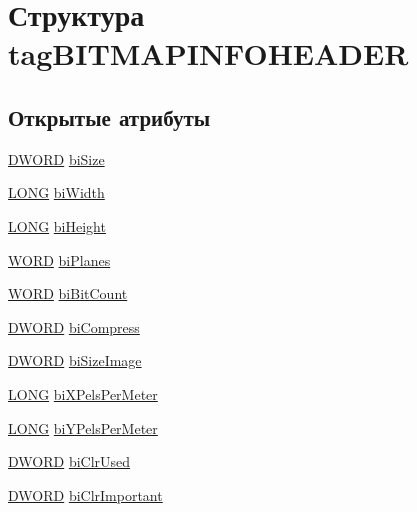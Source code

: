 \hypertarget{structtag_b_i_t_m_a_p_i_n_f_o_h_e_a_d_e_r}{\section{Структура tag\+B\+I\+T\+M\+A\+P\+I\+N\+F\+O\+H\+E\+A\+D\+E\+R}
\label{structtag_b_i_t_m_a_p_i_n_f_o_h_e_a_d_e_r}
}
\subsection*{Открытые атрибуты}
\begin{DoxyCompactItemize}
\item 
\hyperlink{2dgraph_8cpp_a28d75932431ade21e7752c9da7e8b55c}{D\+W\+O\+R\+D} \hyperlink{structtag_b_i_t_m_a_p_i_n_f_o_h_e_a_d_e_r_a78b47f256953606cbf23cd665452a263}{bi\+Size}
\item 
\hyperlink{2dgraph_8cpp_a9154c0d0c21af4686624543215b4e5f2}{L\+O\+N\+G} \hyperlink{structtag_b_i_t_m_a_p_i_n_f_o_h_e_a_d_e_r_a4bbc605184be98c4da36f707f7695e0f}{bi\+Width}
\item 
\hyperlink{2dgraph_8cpp_a9154c0d0c21af4686624543215b4e5f2}{L\+O\+N\+G} \hyperlink{structtag_b_i_t_m_a_p_i_n_f_o_h_e_a_d_e_r_aa18cf290b7f7a6d1cc8058feae85ab68}{bi\+Height}
\item 
\hyperlink{2dgraph_8cpp_a197942eefa7db30960ae396d68339b97}{W\+O\+R\+D} \hyperlink{structtag_b_i_t_m_a_p_i_n_f_o_h_e_a_d_e_r_a261e0f0a578bcd4d53a4a221e6ebe2fa}{bi\+Planes}
\item 
\hyperlink{2dgraph_8cpp_a197942eefa7db30960ae396d68339b97}{W\+O\+R\+D} \hyperlink{structtag_b_i_t_m_a_p_i_n_f_o_h_e_a_d_e_r_a713c58f9cf7d5f115938d189d59fadf5}{bi\+Bit\+Count}
\item 
\hyperlink{2dgraph_8cpp_a28d75932431ade21e7752c9da7e8b55c}{D\+W\+O\+R\+D} \hyperlink{structtag_b_i_t_m_a_p_i_n_f_o_h_e_a_d_e_r_a0dcb903aedbf5e16d964e5a96e44903b}{bi\+Compress}
\item 
\hyperlink{2dgraph_8cpp_a28d75932431ade21e7752c9da7e8b55c}{D\+W\+O\+R\+D} \hyperlink{structtag_b_i_t_m_a_p_i_n_f_o_h_e_a_d_e_r_ac69dfda61a32d8ec53dd11ef165d198b}{bi\+Size\+Image}
\item 
\hyperlink{2dgraph_8cpp_a9154c0d0c21af4686624543215b4e5f2}{L\+O\+N\+G} \hyperlink{structtag_b_i_t_m_a_p_i_n_f_o_h_e_a_d_e_r_ae363738b6e92248a7be41f4e7ed55c54}{bi\+X\+Pels\+Per\+Meter}
\item 
\hyperlink{2dgraph_8cpp_a9154c0d0c21af4686624543215b4e5f2}{L\+O\+N\+G} \hyperlink{structtag_b_i_t_m_a_p_i_n_f_o_h_e_a_d_e_r_ac6226594275d045ff0d03849945d920f}{bi\+Y\+Pels\+Per\+Meter}
\item 
\hyperlink{2dgraph_8cpp_a28d75932431ade21e7752c9da7e8b55c}{D\+W\+O\+R\+D} \hyperlink{structtag_b_i_t_m_a_p_i_n_f_o_h_e_a_d_e_r_adbf6bd52839895672030a734d2ae752f}{bi\+Clr\+Used}
\item 
\hyperlink{2dgraph_8cpp_a28d75932431ade21e7752c9da7e8b55c}{D\+W\+O\+R\+D} \hyperlink{structtag_b_i_t_m_a_p_i_n_f_o_h_e_a_d_e_r_a637282b108fc8ac3bdf41479f9931ccb}{bi\+Clr\+Important}
\end{DoxyCompactItemize}


